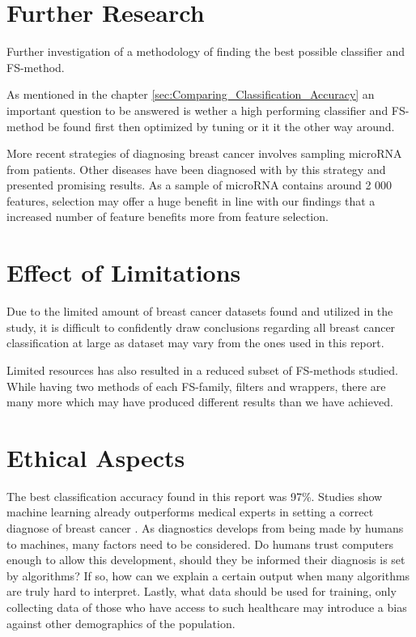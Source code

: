 \section{Further Research}

Further investigation of a methodology of finding the best possible classifier and FS-method.

As mentioned in the chapter \ref{sec:Comparing_Classification_Accuracy} an important question to be answered is wether a high performing classifier and FS-method be found first then optimized by tuning or it it the other way around.

More recent strategies of diagnosing breast cancer involves sampling microRNA from patients. Other diseases have been diagnosed with by this strategy and presented promising results. As a sample of microRNA contains around 2 000 features, selection may offer a huge benefit in line with our findings that a increased number of feature benefits more from feature selection.

\section{Effect of Limitations}

Due to the limited amount of breast cancer datasets found and utilized in the study, it is difficult to confidently draw conclusions regarding all breast cancer classification at large as dataset may vary from the ones used in this report.

Limited resources has also resulted in a reduced subset of FS-methods studied. While having two methods of each FS-family, filters and wrappers, there are many more which may have produced different results than we have achieved.


\section{Ethical Aspects}

The best classification accuracy found in this report was 97\%. Studies show machine learning already outperforms medical experts in setting a correct diagnose of breast cancer \parencite{fnab}. As diagnostics develops from being made by humans to machines, many factors need to be considered. Do humans trust computers enough to allow this development, should they be informed their diagnosis is set by algorithms? If so, how can we explain a certain output when many algorithms are truly hard to interpret. Lastly, what data should be used for training, only collecting data of those who have access to such healthcare may introduce a bias against other demographics of the population.

